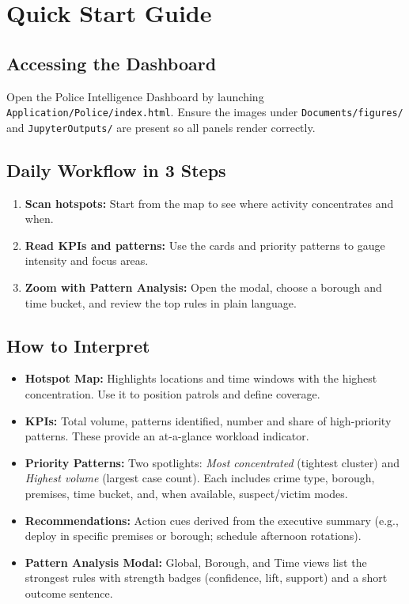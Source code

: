 \documentclass[11pt]{article}
\begin{document}
\section{Quick Start Guide}

\subsection{Accessing the Dashboard}
Open the Police Intelligence Dashboard by launching \texttt{Application/Police/index.html}. Ensure the images under \texttt{Documents/figures/} and \texttt{JupyterOutputs/} are present so all panels render correctly.

\subsection{Daily Workflow in 3 Steps}
\begin{enumerate}
  \item \textbf{Scan hotspots:} Start from the map to see where activity concentrates and when.
  \item \textbf{Read KPIs and patterns:} Use the cards and priority patterns to gauge intensity and focus areas.
  \item \textbf{Zoom with Pattern Analysis:} Open the modal, choose a borough and time bucket, and review the top rules in plain language.
\end{enumerate}

\subsection{How to Interpret}
\begin{itemize}[leftmargin=*]
  \item \textbf{Hotspot Map:} Highlights locations and time windows with the highest concentration. Use it to position patrols and define coverage.
  \item \textbf{KPIs:} Total volume, patterns identified, number and share of high-priority patterns. These provide an at-a-glance workload indicator.
  \item \textbf{Priority Patterns:} Two spotlights: \emph{Most concentrated} (tightest cluster) and \emph{Highest volume} (largest case count). Each includes crime type, borough, premises, time bucket, and, when available, suspect/victim modes.
  \item \textbf{Recommendations:} Action cues derived from the executive summary (e.g., deploy in specific premises or borough; schedule afternoon rotations).
  \item \textbf{Pattern Analysis Modal:} Global, Borough, and Time views list the strongest rules with strength badges (confidence, lift, support) and a short outcome sentence.
\end{itemize}
\end{document}
